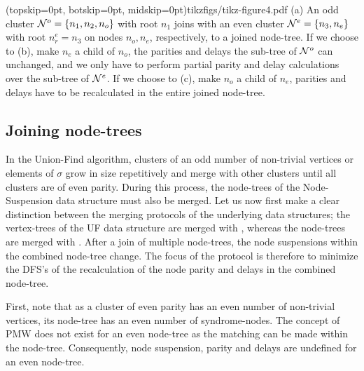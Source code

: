 \Figure[ht](topskip=0pt, botskip=0pt, midskip=0pt){tikzfigs/tikz-figure4.pdf}{
    (a) An odd cluster $\mathcal{N}^o=\{n_1, n_2, n_o\}$ with root $n_1$ joins with an even cluster $\mathcal{N}^e=\{n_3, n_e\}$ with root $n^e_r=n_3$ on nodes $n_o, n_e$, respectively, to a joined node-tree. If we choose to (b), make $n_e$ a child of $n_o$, the parities and delays the sub-tree of $\mathcal{N}^o$ can unchanged, and we only have to perform partial parity and delay calculations over the sub-tree of $\mathcal{N}^e$. If we choose to (c), make $n_o$ a child of $n_e$, parities and delays have to be recalculated in the entire joined node-tree. \label{fig4}}

\subsection{Joining node-trees}\label{sec:nodejoin}

In the Union-Find algorithm, clusters of an odd number of non-trivial vertices or elements of $\sigma$ grow in size repetitively and merge with other clusters until all clusters are of even parity. During this process, the node-trees of the Node-Suspension data structure must also be merged. Let us now first make a clear distinction between the merging protocols of the underlying data structures; the vertex-trees of the UF data structure are merged with , whereas the node-trees are merged with . After a join of multiple node-trees, the node suspensions within the combined node-tree change. The focus of the  protocol is therefore to minimize the DFS's of the recalculation of the node parity and delays in the combined node-tree. 

First, note that as a cluster of even parity has an even number of non-trivial vertices, its node-tree has an even number of syndrome-nodes. The concept of PMW does not exist for an even node-tree as the matching can be made within the node-tree. Consequently, node suspension, parity and delays are undefined for an even node-tree. 

